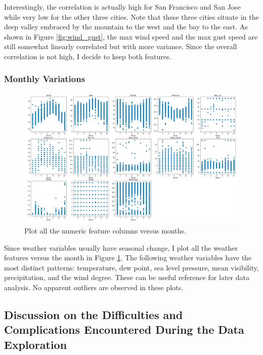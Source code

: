 \documentclass[a4paper]{article}
\begin{document}
			Interestingly, the correlation is actually high for San Francisco and San Jose while very low for the other three cities. Note that these three cities situate in the deep valley embraced by the mountain to the west and the bay to the east. As shown in Figure \ref{fig:wind_gust}, the max wind speed and the max gust speed are still somewhat linearly correlated but with more variance. Since the overall correlation is not high, I decide to keep both features.
					
			\subsubsection{Monthly Variations}
			
			\begin{figure}
				\centering
				\includegraphics[width=1\textwidth]{WeatherMonthly.png}
				\caption{\label{fig:weather_monthly}Plot all the numeric feature columns versus months.}
			\end{figure}			
			
			Since weather variables usually have seasonal change, I plot all the weather features versus the month in Figure \ref{fig:weather_monthly}. The following weather variables have the most distinct patterns: temperature, dew point, sea level pressure, mean visibility, precipitation, and the wind degree. These can be useful reference for later data analysis. No apparent outliers are observed in these plots.
		
		\subsection{Discussion on the Difficulties and Complications Encountered During the Data Exploration}
		
\end{document}
